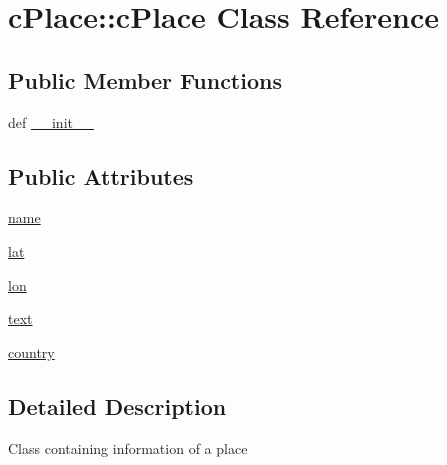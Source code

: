 \hypertarget{classcPlace_1_1cPlace}{\section{c\-Place\-:\-:c\-Place \-Class \-Reference}
\label{classcPlace_1_1cPlace}
}
\subsection*{\-Public \-Member \-Functions}
\begin{DoxyCompactItemize}
\item 
def \hyperlink{classcPlace_1_1cPlace_ad3c4c45bb101418de02e6652dcc34f7b}{\-\_\-\-\_\-init\-\_\-\-\_\-}
\end{DoxyCompactItemize}
\subsection*{\-Public \-Attributes}
\begin{DoxyCompactItemize}
\item 
\hyperlink{classcPlace_1_1cPlace_af91caa448be438c836129f377892e677}{name}
\item 
\hyperlink{classcPlace_1_1cPlace_aaf2f667c9f37b5a27c998f56f0bc99ba}{lat}
\item 
\hyperlink{classcPlace_1_1cPlace_a7798367307ce5a9c96b344f9bf291984}{lon}
\item 
\hyperlink{classcPlace_1_1cPlace_a379418fac881c01b5d36d9596ea3f9bb}{text}
\item 
\hyperlink{classcPlace_1_1cPlace_ac9bda2cceef9b3a18707d1864b0beb4f}{country}
\end{DoxyCompactItemize}


\subsection{\-Detailed \-Description}
\begin{DoxyVerb}
    Class containing information of a place
\end{DoxyVerb}
 

